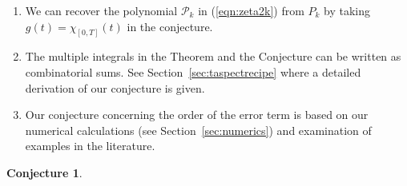 \documentclass[12pt,letterpaper]{amsart}
\theoremstyle{plain}
\newtheorem{conjecture}[theorem]{Conjecture}
\theoremstyle{definition}
\theoremstyle{remark}
\numberwithin{equation}{subsection}
\numberwithin{theorem}{subsection}
\numberwithin{table}{subsection}
\begin{document}
\begin{enumerate}
\item We can recover the polynomial ${\mathcal P}_k$ in (\ref{eqn:zeta2k}) from $P_k$ by taking
$g(t) = \chi_{[0,T]}(t)$ in the conjecture.

\item The multiple integrals in the Theorem and the Conjecture
can be written as combinatorial sums.  See Section~\ref{sec:taspectrecipe}
where a detailed derivation of our conjecture is given.

\item Our conjecture concerning the order of the error term is
based on our numerical calculations (see Section~\ref{sec:numerics}) and
examination of examples in the literature.

\end{enumerate}


\begin{conjecture} \label{thm:Lhalfchidconjecture}


\end{conjecture}
\end{document}
